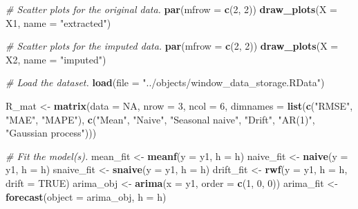 \documentclass[
]{article}
\newenvironment{Shaded}{\begin{snugshade}}{\end{snugshade}}
\newcommand{\AttributeTok}[1]{\textcolor[rgb]{0.13,0.29,0.53}{#1}}
\newcommand{\CommentTok}[1]{\textcolor[rgb]{0.56,0.35,0.01}{\textit{#1}}}
\newcommand{\ConstantTok}[1]{\textcolor[rgb]{0.56,0.35,0.01}{#1}}
\newcommand{\DecValTok}[1]{\textcolor[rgb]{0.00,0.00,0.81}{#1}}
\newcommand{\FunctionTok}[1]{\textcolor[rgb]{0.13,0.29,0.53}{\textbf{#1}}}
\newcommand{\NormalTok}[1]{#1}
\newcommand{\OtherTok}[1]{\textcolor[rgb]{0.56,0.35,0.01}{#1}}
\newcommand{\StringTok}[1]{\textcolor[rgb]{0.31,0.60,0.02}{#1}}
\begin{document}
\begin{Shaded}
\begin{Highlighting}[]
\CommentTok{\# Scatter plots for the original data.}
\FunctionTok{par}\NormalTok{(}\AttributeTok{mfrow =} \FunctionTok{c}\NormalTok{(}\DecValTok{2}\NormalTok{, }\DecValTok{2}\NormalTok{))}
\FunctionTok{draw\_plots}\NormalTok{(}\AttributeTok{X =}\NormalTok{ X1, }\AttributeTok{name =} \StringTok{"extracted"}\NormalTok{)}

\CommentTok{\# Scatter plots for the imputed data.}
\FunctionTok{par}\NormalTok{(}\AttributeTok{mfrow =} \FunctionTok{c}\NormalTok{(}\DecValTok{2}\NormalTok{, }\DecValTok{2}\NormalTok{))}
\FunctionTok{draw\_plots}\NormalTok{(}\AttributeTok{X =}\NormalTok{ X2, }\AttributeTok{name =} \StringTok{"imputed"}\NormalTok{)}

\CommentTok{\# Load the dataset.}
\FunctionTok{load}\NormalTok{(}\AttributeTok{file =} \StringTok{"../objects/window\_data\_storage.RData"}\NormalTok{)}


\NormalTok{R\_mat }\OtherTok{\textless{}{-}} \FunctionTok{matrix}\NormalTok{(}\AttributeTok{data =} \ConstantTok{NA}\NormalTok{, }\AttributeTok{nrow =} \DecValTok{3}\NormalTok{, }\AttributeTok{ncol =} \DecValTok{6}\NormalTok{, }
                \AttributeTok{dimnames =} \FunctionTok{list}\NormalTok{(}\FunctionTok{c}\NormalTok{(}\StringTok{"RMSE"}\NormalTok{, }\StringTok{"MAE"}\NormalTok{, }\StringTok{"MAPE"}\NormalTok{), }
                                \FunctionTok{c}\NormalTok{(}\StringTok{"Mean"}\NormalTok{, }\StringTok{"Naive"}\NormalTok{, }\StringTok{"Seasonal naive"}\NormalTok{, }\StringTok{"Drift"}\NormalTok{, }\StringTok{"AR(1)"}\NormalTok{, }\StringTok{"Gaussian process"}\NormalTok{)))}

\CommentTok{\# Fit the model(s).}
\NormalTok{mean\_fit }\OtherTok{\textless{}{-}} \FunctionTok{meanf}\NormalTok{(}\AttributeTok{y =}\NormalTok{ y1, }\AttributeTok{h =}\NormalTok{ h)}
\NormalTok{naive\_fit }\OtherTok{\textless{}{-}} \FunctionTok{naive}\NormalTok{(}\AttributeTok{y =}\NormalTok{ y1, }\AttributeTok{h =}\NormalTok{ h)}
\NormalTok{snaive\_fit }\OtherTok{\textless{}{-}} \FunctionTok{snaive}\NormalTok{(}\AttributeTok{y =}\NormalTok{ y1, }\AttributeTok{h =}\NormalTok{ h)}
\NormalTok{drift\_fit }\OtherTok{\textless{}{-}} \FunctionTok{rwf}\NormalTok{(}\AttributeTok{y =}\NormalTok{ y1, }\AttributeTok{h =}\NormalTok{ h, }\AttributeTok{drift =} \ConstantTok{TRUE}\NormalTok{)}
\NormalTok{arima\_obj }\OtherTok{\textless{}{-}} \FunctionTok{arima}\NormalTok{(}\AttributeTok{x =}\NormalTok{ y1, }\AttributeTok{order =} \FunctionTok{c}\NormalTok{(}\DecValTok{1}\NormalTok{, }\DecValTok{0}\NormalTok{, }\DecValTok{0}\NormalTok{))}
\NormalTok{arima\_fit }\OtherTok{\textless{}{-}} \FunctionTok{forecast}\NormalTok{(}\AttributeTok{object =}\NormalTok{ arima\_obj, }\AttributeTok{h =}\NormalTok{ h)}


\end{Highlighting}
\end{Shaded}
\end{document}
